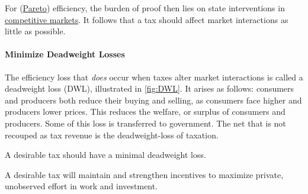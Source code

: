 For (\hyperref[sec:Pareto]{Pareto}) efficiency, the burden of proof then lies on state interventions in \hyperref[sec:CompetitiveMarkets]{competitive markets}. It follows that a tax should affect market interactions as little as possible.

\paragraph{Minimize Deadweight Losses}
The efficiency loss that \emph{does} occur when taxes alter market interactions is called a deadweight loss (DWL), illustrated in \autoref{fig:DWL}. It arises as follows: consumers and producers both reduce their buying and selling, as consumers face higher and producers lower prices. This reduces the welfare, or surplus of consumers and producers. Some of this loss is transferred to government. The net that is not recouped as tax revenue is the deadweight-loss of taxation. %


\begin{desideratum}
	A desirable tax should have a minimal deadweight loss.
	\label{des:DWL}
\end{desideratum}

\begin{desideratum}[Incentives]%
	A desirable tax will maintain and strengthen incentives to maximize private, unobserved effort in work and investment.
	\label{des:Incentives}
\end{desideratum}


